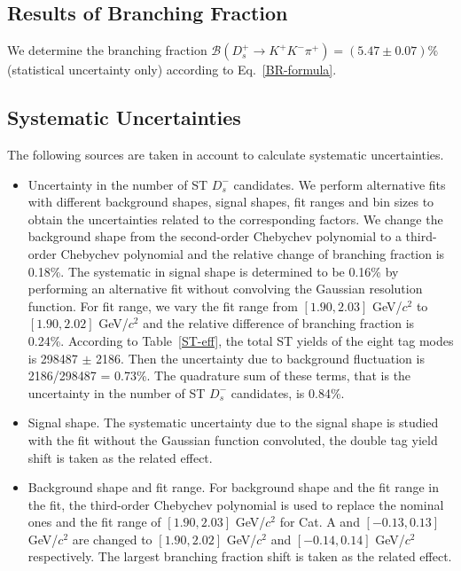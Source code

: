 {    \subsection{Results of Branching Fraction}



    We determine the branching fraction $\mathcal{B}(D_{s}^{+} \rightarrow K^{+}K^{-}\pi^{+})=(5.47\pm0.07)\%$ (statistical uncertainty only) according to Eq.~\ref{BR-formula}.

    \subsection{Systematic Uncertainties}
    The following sources are taken in account to calculate systematic uncertainties.

    \begin{itemize}
        \item Uncertainty in the number of ST $D_{s}^{-}$ candidates. We perform alternative fits with different background shapes, signal shapes, fit ranges and bin sizes to obtain the uncertainties related to the corresponding factors.
            We change the background shape from the second-order Chebychev polynomial to a third-order Chebychev polynomial and the relative change of branching fraction is 0.18\%.
            The systematic in signal shape is determined to be 0.16\% by performing an alternative fit without convolving the Gaussian resolution function.
            For fit range, we vary the fit range from $[1.90, 2.03]$ GeV/$c^{2}$ to $[1.90, 2.02]$ GeV/$c^{2}$ and the relative difference of branching fraction is 0.24\%.
            According to Table~\ref{ST-eff}, the total ST yields of the eight tag modes is  298487 $\pm$ 2186. Then the uncertainty due to background fluctuation is 2186/298487 = 0.73\%.
            The quadrature sum of these terms, that is the uncertainty in the number of ST $D_{s}^{-}$ candidates, is 0.84\%. 
        
        \item Signal shape. The systematic uncertainty due to the signal shape is studied with the fit without the Gaussian function convoluted, the double tag yield shift is taken as the related effect. 

        \item Background shape and fit range. For background shape and the fit range in the fit, the third-order Chebychev polynomial is used to replace the nominal ones and the fit  range of $[1.90, 2.03]$ GeV/$c^{2}$ for Cat. A and $[-0.13, 0.13]$ GeV/$c^{2}$ are changed to $[1.90, 2.02]$ GeV/$c^{2}$ and $[-0.14, 0.14]$ GeV/$c^{2}$ respectively. 
            The largest branching fraction shift is taken as the related effect.
        

\end{itemize}}
